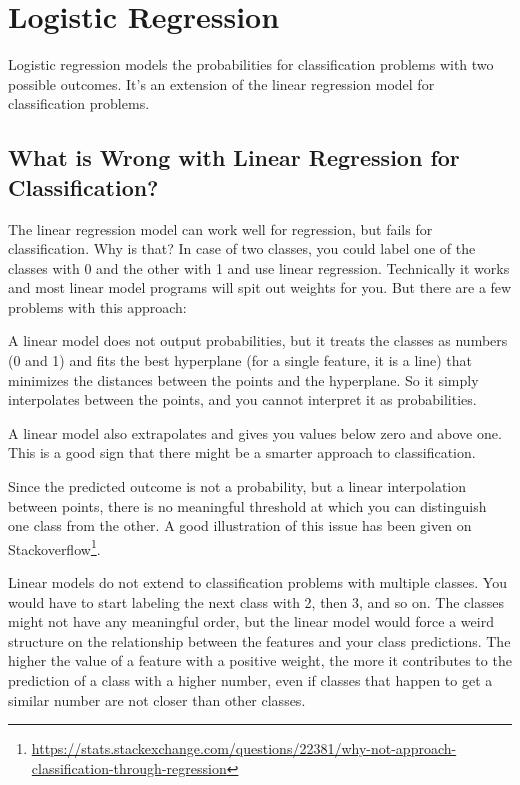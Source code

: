 \documentclass[
  12pt,
]{krantz}
\renewcommand{\href}[2]{#2\footnote{\url{#1}}}
\begin{document}
\newpage

\hypertarget{logistic}{%
\section{Logistic Regression}\label{logistic}}

Logistic regression models the probabilities for classification problems with two possible outcomes.
It's an extension of the linear regression model for classification problems.

\hypertarget{what-is-wrong-with-linear-regression-for-classification}{%
\subsection{What is Wrong with Linear Regression for Classification?}\label{what-is-wrong-with-linear-regression-for-classification}}

The linear regression model can work well for regression, but fails for classification.
Why is that?
In case of two classes, you could label one of the classes with 0 and the other with 1 and use linear regression.
Technically it works and most linear model programs will spit out weights for you.
But there are a few problems with this approach:

A linear model does not output probabilities, but it treats the classes as numbers (0 and 1) and fits the best hyperplane (for a single feature, it is a line) that minimizes the distances between the points and the hyperplane.
So it simply interpolates between the points, and you cannot interpret it as probabilities.

A linear model also extrapolates and gives you values below zero and above one.
This is a good sign that there might be a smarter approach to classification.

Since the predicted outcome is not a probability, but a linear interpolation between points, there is no meaningful threshold at which you can distinguish one class from the other.
A good illustration of this issue has been given on \href{https://stats.stackexchange.com/questions/22381/why-not-approach-classification-through-regression}{Stackoverflow}.

Linear models do not extend to classification problems with multiple classes.
You would have to start labeling the next class with 2, then 3, and so on.
The classes might not have any meaningful order, but the linear model would force a weird structure on the relationship between the features and your class predictions.
The higher the value of a feature with a positive weight, the more it contributes to the prediction of a class with a higher number, even if classes that happen to get a similar number are not closer than other classes.
\end{document}
